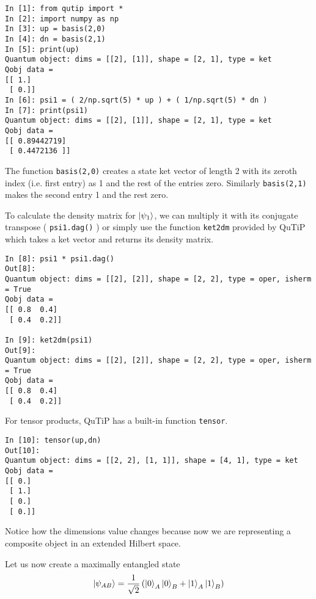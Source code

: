 \begin{verbatim}
In [1]: from qutip import *
In [2]: import numpy as np
In [3]: up = basis(2,0)
In [4]: dn = basis(2,1)
In [5]: print(up)
Quantum object: dims = [[2], [1]], shape = [2, 1], type = ket
Qobj data =
[[ 1.]
 [ 0.]]
In [6]: psi1 = ( 2/np.sqrt(5) * up ) + ( 1/np.sqrt(5) * dn )
In [7]: print(psi1)
Quantum object: dims = [[2], [1]], shape = [2, 1], type = ket
Qobj data =
[[ 0.89442719]
 [ 0.4472136 ]]
\end{verbatim}
The function \texttt{basis(2,0)} creates a state ket vector of length 2 with its zeroth index (i.e. first entry) as 1 and the rest of the entries zero. Similarly \texttt{basis(2,1)} makes the second entry 1 and the rest zero.
\par To calculate the density matrix for $\ket{\psi_1}$, we can multiply it with its conjugate transpose ( \texttt{psi1.dag()} ) or simply use the function \texttt{ket2dm} provided by QuTiP which takes a ket vector and returns its density matrix.
\begin{verbatim}
In [8]: psi1 * psi1.dag()
Out[8]: 
Quantum object: dims = [[2], [2]], shape = [2, 2], type = oper, isherm = True
Qobj data =
[[ 0.8  0.4]
 [ 0.4  0.2]]
 
In [9]: ket2dm(psi1)
Out[9]: 
Quantum object: dims = [[2], [2]], shape = [2, 2], type = oper, isherm = True
Qobj data =
[[ 0.8  0.4]
 [ 0.4  0.2]]
\end{verbatim}
For tensor products, QuTiP has a built-in function \texttt{tensor}.
\begin{verbatim}
In [10]: tensor(up,dn)
Out[10]: 
Quantum object: dims = [[2, 2], [1, 1]], shape = [4, 1], type = ket
Qobj data =
[[ 0.]
 [ 1.]
 [ 0.]
 [ 0.]]
\end{verbatim}
Notice how the dimensions value changes because now we are representing a composite object in an extended Hilbert space.
\par Let us now create a maximally entangled state
\begin{align*}
\ket{\psi_{AB}} = \frac{1}{\sqrt{2}} \left( \ket{0}_A \ket{0}_B + \ket{1}_A \ket{1}_B \right)
\end{align*}

